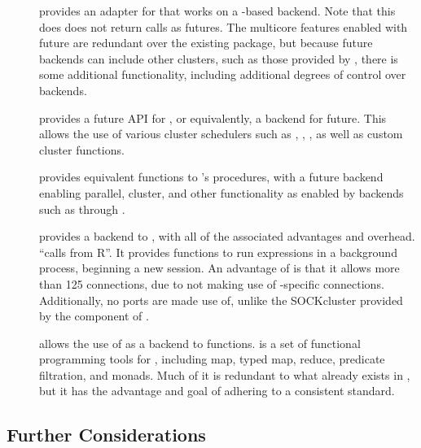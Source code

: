 \begin{description}
    \item[]
        \textcite{bengtsson20do} provides an adapter for \cite{microsoft20}
        that works on a -based backend. Note that this does does not
        return  calls as futures. The multicore features enabled with
        future are redundant over the existing  package, but because
        future backends can include other clusters, such as those provided by
        , there is some additional functionality, including additional
        degrees of control over backends.
    \item[]
        \cite{bengtsson19batch} provides a future API for
        \cite{lang17}, or equivalently, a  backend for
        future. This allows the use of various cluster schedulers such as
        , , , as well as custom cluster functions.
    \item[]
        \textcite{bengtsson20apply} provides equivalent functions to \R's
         procedures, with a future backend enabling parallel,
        cluster, and other functionality as enabled by backends such as
         through .
    \item[]
        \textcite{bengtsson19callr} provides a \cite{csardi20} backend to
        , with all of the associated advantages and overhead. 
        ``calls \R from R''. It provides functions to run expressions in a
        background \R process, beginning a new session. An advantage of  is
        that it allows more than 125 connections, due to not making use of
        \R-specific connections. Additionally, no ports are made use of, unlike
        the SOCKcluster provided by the  component of .
    \item[]
        \textcite{vaughan18} allows the use of  as a backend to 
        functions.  is a set of functional programming tools for \R,
        including map, typed map, reduce, predicate filtration, and monads. Much of it is
        redundant to what already exists in \R, but it has the advantage and goal
        of adhering to a consistent standard.
\end{description}

\subsection{Further Considerations}\label{subsec:further-considerations}

